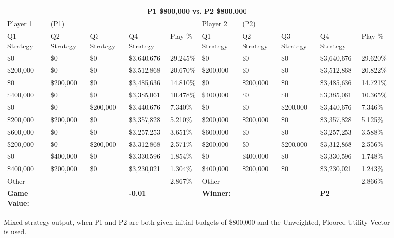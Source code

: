 \documentclass[11pt]{article}
\begin{document}
\begin{figure}
\tiny
\begin{tabular}{ |p{1.0cm}p{1.0cm}p{1.0cm}p{2.0cm}|p{1.0cm}||p{1.0cm}p{1.0cm}p{1.0cm}p{2.0cm}|p{1.0cm}|}
\hline
\multicolumn{10}{|c|}{P1 \$800,000 vs. P2 \$800,000} \\
\hline
Player 1 & (P1) & & & & Player 2 & (P2) & & & \\
\hline
Q1 Strategy & Q2 Strategy & Q3 Strategy & Q4 Strategy  &  Play \% & Q1 Strategy & Q2 Strategy & Q3 Strategy & Q4 Strategy  &  Play \%\\
\hline
\$0 & \$0 & \$0 & \$3,640,676 & 29.245\%            & \$0 & \$0 & \$0 & \$3,640,676 & 29.620\%\\
\$200,000 & \$0 & \$0 & \$3,512,868 & 20.670\%      & \$200,000 & \$0 & \$0 & \$3,512,868 & 20.822\%\\
\$0 & \$200,000 & \$0 & \$3,485,636 & 14.810\%      & \$0 & \$200,000 & \$0 & \$3,485,636 & 14.721\%\\
\$400,000 & \$0 & \$0 & \$3,385,061 & 10.478\%      & \$400,000 & \$0 & \$0 & \$3,385,061 & 10.365\%\\
\$0 & \$0 & \$200,000 & \$3,440,676 & 7.340\%       & \$0 & \$0 & \$200,000 & \$3,440,676 & 7.346\%\\
\$200,000 & \$200,000 & \$0 & \$3,357,828 & 5.210\% & \$200,000 & \$200,000 & \$0 & \$3,357,828 & 5.125\%\\
\$600,000 & \$0 & \$0 & \$3,257,253 & 3.651\%       & \$600,000 & \$0 & \$0 & \$3,257,253 & 3.588\%\\
\$200,000 & \$0 & \$200,000 & \$3,312,868 & 2.571\% & \$200,000 & \$0 & \$200,000 & \$3,312,868 & 2.556\%\\
\$0 & \$400,000 & \$0 & \$3,330,596 & 1.854\%       & \$0 & \$400,000 & \$0 & \$3,330,596 & 1.748\%\\
\$400,000 & \$200,000 & \$0 & \$3,230,021 & 1.304\% & \$400,000 & \$200,000 & \$0 & \$3,230,021 & 1.243\%\\
\hline
Other & & & & 2.867\%                               & Other & & & & 2.866\% \\
\hline
\small \textbf{Game Value:} &&& \small \textbf{-0.01} && \small \textbf{Winner:} &&& \small \textbf{P2}&\\
\hline
\end{tabular}
\caption{Mixed strategy output, when P1 and P2 are both given initial budgets of \$800,000 and the Unweighted, Floored Utility Vector is used.}
\label{8v8table.1}
\end{figure}
\end{document}
